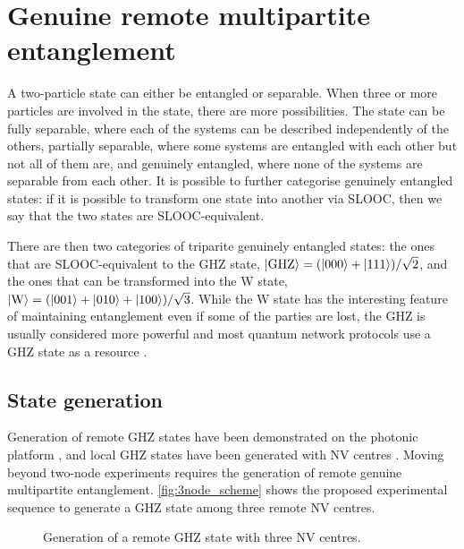 \documentclass[a4paper, twoside]{article}
\begin{document}
\section{Genuine remote multipartite entanglement}
\label{sec:multipartite}
A two-particle state can either be entangled or separable. When three or more particles are involved in the state, there are more possibilities. The state can be fully separable, where each of the systems can be described independently of the others, partially separable, where some systems are entangled with each other but not all of them are, and genuinely entangled, where none of the systems are separable from each other.
It is possible to further categorise genuinely entangled states: if it is possible to transform one state into another via \ac{SLOOC}, then we say that the two states are \ac{SLOOC}-equivalent.

There are then two categories of triparite genuinely entangled states: the ones that are \ac{SLOOC}-equivalent to the \ac{GHZ} state, $\ket{\text{GHZ}} = (\ket{000} + \ket{111})/\sqrt 2 $, and the ones that can be transformed into the W state, $\ket{\text{W}} = (\ket{001} + \ket{010} + \ket{100})/\sqrt 3 $. While the W state has the interesting feature of maintaining entanglement even if some of the parties are lost, the \ac{GHZ} is usually considered more powerful and most quantum network protocols use a GHZ state as a resource . 

\subsection{State generation}

Generation of remote GHZ states have been demonstrated on the photonic platform \cite{Bouwmeester1999}, and local GHZ states have been generated with \ac{NV} centres . Moving beyond two-node experiments requires the generation of remote genuine multipartite entanglement. \autoref{fig:3node_scheme} shows the proposed experimental sequence to generate a GHZ state among three remote \ac{NV} centres.

\begin{figure}
	\caption{Generation of a remote GHZ state with three \ac{NV} centres.}
	\label{fig:3node_scheme}
\end{figure}
\end{document}
